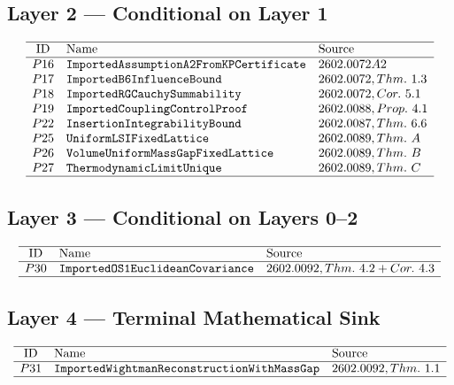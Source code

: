 \documentclass[11pt,a4paper]{article}
\begin{document}
\subsection{Layer 2 --- Conditional on Layer 1}

\[
\begin{array}{cll}
\hline
\text{ID} & \text{Name} & \text{Source} \\
\hline
P16 & \texttt{ImportedAssumptionA2FromKPCertificate} & 2602.0072 A2 \\
P17 & \texttt{ImportedB6InfluenceBound} & 2602.0072, Thm.~1.3 \\
P18 & \texttt{ImportedRGCauchySummability} & 2602.0072, Cor.~5.1 \\
P19 & \texttt{ImportedCouplingControlProof} & 2602.0088, Prop.~4.1 \\
P22 & \texttt{InsertionIntegrabilityBound} & 2602.0087, Thm.~6.6 \\
P25 & \texttt{UniformLSIFixedLattice} & 2602.0089, Thm.~A \\
P26 & \texttt{VolumeUniformMassGapFixedLattice} & 2602.0089, Thm.~B \\
P27 & \texttt{ThermodynamicLimitUnique} & 2602.0089, Thm.~C \\
\hline
\end{array}
\]

\subsection{Layer 3 --- Conditional on Layers 0--2}

\[
\begin{array}{cll}
\hline
\text{ID} & \text{Name} & \text{Source} \\
\hline
P30 & \texttt{ImportedOS1EuclideanCovariance} & 2602.0092, Thm.~4.2+Cor.~4.3 \\
\hline
\end{array}
\]

\subsection{Layer 4 --- Terminal Mathematical Sink}

\[
\begin{array}{cll}
\hline
\text{ID} & \text{Name} & \text{Source} \\
\hline
P31 & \texttt{ImportedWightmanReconstructionWithMassGap} & 2602.0092, Thm.~1.1 \\
\hline
\end{array}
\]
\end{document}
